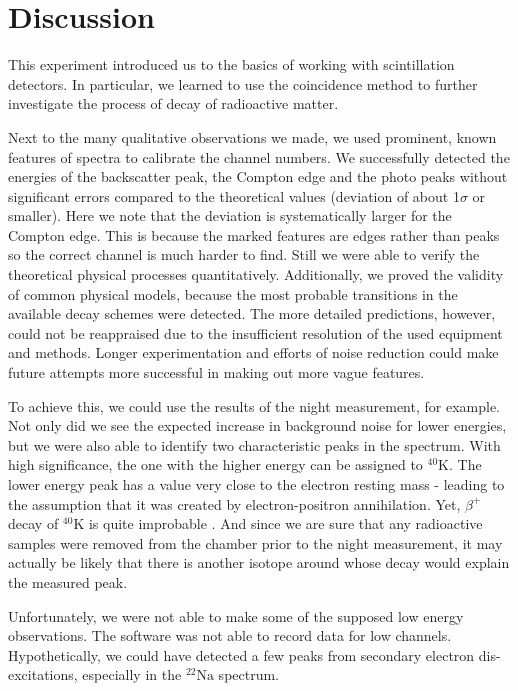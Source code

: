 \section{Discussion}
%
This experiment introduced us to the basics of working with scintillation detectors.
In particular, we learned to use the coincidence method to further investigate the process of decay of radioactive matter.
%
\par
%
Next to the many qualitative observations we made, we used prominent, known features of spectra to calibrate the channel numbers.
We successfully detected the energies of the backscatter peak, the Compton edge and the photo peaks without significant errors compared to the theoretical values (deviation of about \SI{1}{}$\sigma$ or smaller).
Here we note that the deviation is systematically larger for the Compton edge.
This is because the marked features are edges rather than peaks so the correct channel is much harder to find.
Still we were able to verify the theoretical physical processes quantitatively.
Additionally, we proved the validity of common physical models, because the most probable transitions in the available decay schemes were detected.
The more detailed predictions, however, could not be reappraised due to the insufficient resolution of the used equipment and methods.
Longer experimentation and efforts of noise reduction could make future attempts more successful in making out more vague features.
%
\par
%
To achieve this, we could use the results of the night measurement, for example.
Not only did we see the expected increase in background noise for lower energies, but we were also able to identify two characteristic peaks in the spectrum.
With high significance, the one with the higher energy can be assigned to $^{40}\text{K}$.
The lower energy peak has a value very close to the electron resting mass - leading to the assumption that it was created by electron-positron annihilation.
Yet, $\beta^{+}$ decay of $^{40}\text{K}$ is quite improbable \cite{WikiPotassium}.
And since we are sure that any radioactive samples were removed from the chamber prior to the night measurement, it may actually be likely that there is another isotope around whose decay would explain the measured peak.
%
\par
%
Unfortunately, we were not able to make some of the supposed low energy observations.
The software was not able to record data for low channels.
Hypothetically, we could have detected a few peaks from secondary electron dis-excitations, especially in the $^{22}\text{Na}$ spectrum.

